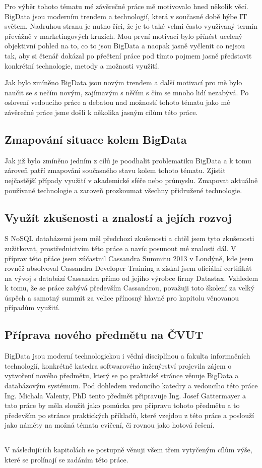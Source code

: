 Pro výběr tohoto tématu mé závěrečné práce mě motivovalo hned několik věcí. BigData jsou moderním trendem a technologií, která v současné době hýbe IT světem. Nadruhou stranu je nutno říci, že je to také velmi často využívaný termín převážně v marketingových kruzích. Mou první motivací bylo přínést ucelený objektivní pohled na to, co to jsou BigData a naopak jasně vyčlenit co nejsou tak, aby si čtenář dokázal po přečtení práce pod tímto pojmem jasně představit konkrétní technologie, metody a možnosti využití. 

Jak bylo zmíněno BigData jsou novým trendem a další motivací pro mě bylo naučit se s nečím novým, zajímavým s něčím s čím se mnoho lidí nezabývá. Po oslovení vedoucího práce a debatou nad možností tohoto tématu jako mé závěrečné práce jsme došli k několika jasným cílům této práce. 

\subsection{Zmapování situace kolem BigData}
Jak již bylo zmíněno jedním z cílů je poodhalit problematiku BigData a k tomu zároveň patří zmapování současného stavu kolem tohoto tématu. Zjistit nejčastější případy využití v akademické sféře nebo průmyslu. Zmapovat aktuálně používané technologie a zaroveň prozkoumat všechny přidružené technologie. 

\subsection{Využít zkušenosti a znalostí a jejích rozvoj}
S NoSQL databázemi jsem měl předchozí zkušenosti a chtěl jsem tyto zkušenosti zužitkovat, prostřednictvím této práce a navíc posunout mé znalosti dál. V příprav této přáce jsem zúčastnil Cassandra Summitu 2013 v Londýně, kde jsem rovněž absolvoval Cassandra Developer Training a získal jsem oficiální certifikát na vývoj s databází Cassandra přímo od jejího výrobce firmy Datastax. Vzhledem k tomu, že se práce zabývá především Cassandrou, považuji toto školení za velký úspěch a samotný summit za velice přínosný hlavně pro kapitolu věnovanou případům využití.

\subsection{Příprava nového předmětu na ČVUT}
BigData jsou moderní technologickou i vědní disciplínou a fakulta informačních technologií, konkrétně katedra softwarového inženýrství projevila zájem o vytvoření nového předmětu, který se po praktické stránce věnuje BigData a databázovým systémum. Pod dohledem vedoucího katedry a vedoucího této práce Ing. Michala Valenty, PhD tento předmět připravuje Ing. Josef Gattermayer a tato práce by měla sloužit jako pomůcka pro připravu tohoto předmětu a to především po stránce praktických příkladů, které vzejdou z této práce a poslouží jako náměty na možná témata cvičení, či rovnou jako hotová řešení. 

\subsection{}
V následujících kapitolách se postupně věnuji všem třem vytyčeným cílům výše, které se prolínají se zadáním této práce. 

